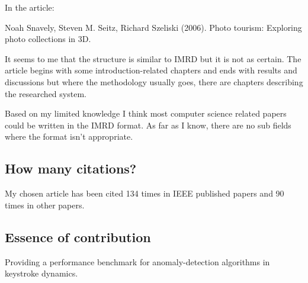 \documentclass[11pt, a4paper]{article}
\begin{document}
\vspace{4mm}

\noindent In the article:

Noah Snavely, Steven M. Seitz, Richard Szeliski (2006). Photo tourism: Exploring photo collections in 3D.

It seems to me that the structure is similar to IMRD but it is not as certain. The article begins with some
introduction-related chapters and ends with results and discussions but where the methodology usually goes,
there are chapters describing the researched system. 

\vspace{4mm}

\noindent Based on my limited knowledge I think most computer science related papers could be written in
the IMRD format. As far as I know, there are no sub fields where the format isn't appropriate.  

\subsection{How many citations?}

My chosen article has been cited 134 times in IEEE published papers and 90 times in other papers.

\subsection{Essence of contribution}

Providing a performance benchmark for anomaly-detection algorithms in keystroke dynamics.
\end{document}
